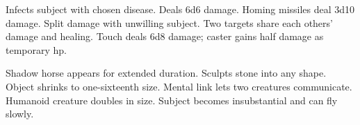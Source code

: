 \begin{swspelllist}
   Infects subject with chosen disease.
   Deals 6d6 damage.
   Homing missiles deal 3d10 damage.
   Split damage with unwilling subject.
   Two targets share each others' damage and healing.
   Touch deals 6d8 damage; caster gains half damage as temporary hp.

   Shadow horse appears for extended duration.
   Sculpts stone into any shape.
   Object shrinks to one-sixteenth size.
   Mental link lets two creatures communicate.
   Humanoid creature doubles in size.
   Subject becomes insubstantial and can fly slowly.
\end{swspelllist}

